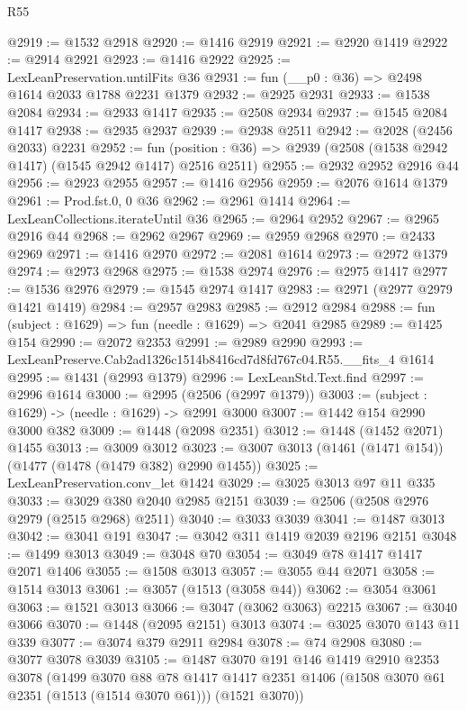 \begin{lexlean}{R55}
\begin{coremodule}
{{@2919 := @1532 @2918
@2920 := @1416 @2919
@2921 := @2920 @1419
@2922 := @2914 @2921
@2923 := @1416 @2922
@2925 := LexLeanPreservation.untilFits @36
@2931 := fun (__p0 : @36) => @2498 @1614 @2033 @1788 @2231 @1379
@2932 := @2925 @2931
@2933 := @1538 @2084
@2934 := @2933 @1417
@2935 := @2508 @2934
@2937 := @1545 @2084 @1417
@2938 := @2935 @2937
@2939 := @2938 @2511
@2942 := @2028 (@2456 @2033) @2231
@2952 := fun (position : @36) => @2939 (@2508 (@1538 @2942 @1417) (@1545 @2942 @1417) @2516 @2511)
@2955 := @2932 @2952 @2916 @44
@2956 := @2923 @2955
@2957 := @1416 @2956
@2959 := @2076 @1614 @1379
@2961 := Prod.fst.{0, 0} @36
@2962 := @2961 @1414
@2964 := LexLeanCollections.iterateUntil @36
@2965 := @2964 @2952
@2967 := @2965 @2916 @44
@2968 := @2962 @2967
@2969 := @2959 @2968
@2970 := @2433 @2969
@2971 := @1416 @2970
@2972 := @2081 @1614
@2973 := @2972 @1379
@2974 := @2973 @2968
@2975 := @1538 @2974
@2976 := @2975 @1417
@2977 := @1536 @2976
@2979 := @1545 @2974 @1417
@2983 := @2971 (@2977 @2979 @1421 @1419)
@2984 := @2957 @2983
@2985 := @2912 @2984
@2988 := fun (subject : @1629) => fun (needle : @1629) => @2041 @2985
@2989 := @1425 @154
@2990 := @2072 @2353
@2991 := @2989 @2990
@2993 := LexLeanPreserve.Cab2ad1326c1514b8416cd7d8fd767c04.R55.__fits_4 @1614
@2995 := @1431 (@2993 @1379)
@2996 := LexLeanStd.Text.find
@2997 := @2996 @1614
@3000 := @2995 (@2506 (@2997 @1379))
@3003 := (subject : @1629) -> (needle : @1629) -> @2991 @3000
@3007 := @1442 @154 @2990 @3000 @382
@3009 := @1448 (@2098 @2351)
@3012 := @1448 (@1452 @2071) @1455
@3013 := @3009 @3012
@3023 := @3007 @3013 (@1461 (@1471 @154)) (@1477 (@1478 (@1479 @382) @2990 @1455))
@3025 := LexLeanPreservation.conv_let @1424
@3029 := @3025 @3013 @97 @11 @335
@3033 := @3029 @380 @2040 @2985 @2151
@3039 := @2506 (@2508 @2976 @2979 (@2515 @2968) @2511)
@3040 := @3033 @3039
@3041 := @1487 @3013
@3042 := @3041 @191
@3047 := @3042 @311 @1419 @2039 @2196 @2151
@3048 := @1499 @3013
@3049 := @3048 @70
@3054 := @3049 @78 @1417 @1417 @2071 @1406
@3055 := @1508 @3013
@3057 := @3055 @44 @2071
@3058 := @1514 @3013
@3061 := @3057 (@1513 (@3058 @44))
@3062 := @3054 @3061
@3063 := @1521 @3013
@3066 := @3047 (@3062 @3063) @2215
@3067 := @3040 @3066
@3070 := @1448 (@2095 @2151) @3013
@3074 := @3025 @3070 @143 @11 @339
@3077 := @3074 @379 @2911 @2984
@3078 := @74 @2908
@3080 := @3077 @3078 @3039
@3105 := @1487
    @3070
    @191
    @146
    @1419
    @2910
    @2353
    @3078
    (@1499
      @3070
      @88
      @78
      @1417
      @1417
      @2351
      @1406
      (@1508 @3070 @61 @2351 (@1513 (@1514 @3070 @61)))
      (@1521 @3070))
}}
\end{coremodule}
\end{lexlean}

